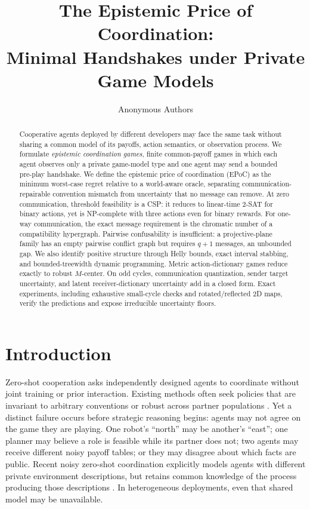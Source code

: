 \documentclass[letterpaper]{article} %
\title{The Epistemic Price of Coordination:\\
Minimal Handshakes under Private Game Models}
\author{Anonymous Authors}
\begin{document}
\maketitle

\begin{abstract}
Cooperative agents deployed by different developers may face the same task
without sharing a common model of its payoffs, action semantics, or observation
process. We formulate \emph{epistemic coordination games}, finite common-payoff
games in which each agent observes only a private game-model type and one agent
may send a bounded pre-play handshake. We define the epistemic price of
coordination (EPoC) as the minimum worst-case regret relative to a world-aware
oracle, separating communication-repairable convention mismatch from uncertainty
that no message can remove. At zero communication, threshold feasibility is a
CSP: it reduces to linear-time 2-SAT for binary actions, yet is NP-complete with
three actions even for binary rewards. For one-way communication, the exact
message requirement is the chromatic number of a compatibility hypergraph.
Pairwise confusability is insufficient: a projective-plane family has an empty
pairwise conflict graph but requires $q+1$ messages, an unbounded gap. We also
identify positive structure through Helly bounds, exact interval stabbing, and
bounded-treewidth dynamic programming. Metric action-dictionary games reduce
exactly to robust $M$-center. On odd cycles, communication quantization, sender
target uncertainty, and latent receiver-dictionary uncertainty add in a closed
form. Exact experiments, including exhaustive small-cycle checks and
rotated/reflected 2D maps, verify the predictions and expose irreducible
uncertainty floors.
\end{abstract}

\section{Introduction}

Zero-shot cooperation asks independently designed agents to coordinate without
joint training or prior interaction. Existing methods often seek policies that
are invariant to arbitrary conventions or robust across partner populations
\citep{hu2020otherplay,strouse2021collaborating,li2023cole,jha2025cross}.
Yet a distinct failure occurs before strategic reasoning begins: agents may not
agree on the game they are playing. One robot's ``north'' may be another's
``east''; one planner may believe a role is feasible while its partner does
not; two agents may receive different noisy payoff tables; or they may disagree
about which facts are public. Recent noisy zero-shot coordination explicitly
models agents with different private environment descriptions, but retains
common knowledge of the process producing those descriptions
\citep{anwar2024noisy}. In heterogeneous deployments, even that shared model
may be unavailable.
\end{document}
